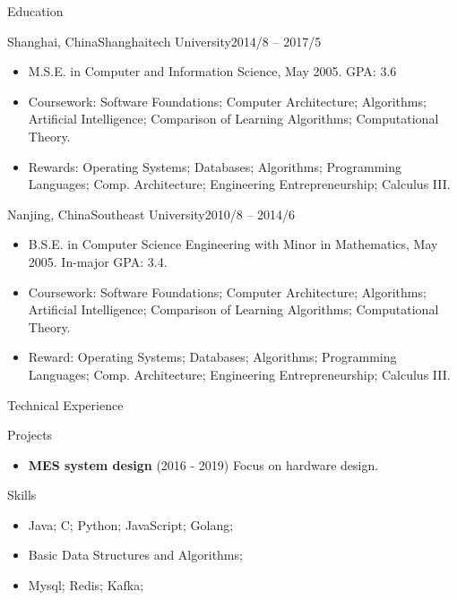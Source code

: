 \documentclass[]{minhuacv}
\begin{document}
	\begin{cvsection}{Education}
		\begin{cvsubsection}{Shanghai, China}{Shanghaitech University}{2014/8 -- 2017/5}
			\begin{itemize}
				\item M.S.E. in Computer and Information Science, May 2005. GPA: 3.6
				\item Coursework: Software Foundations; Computer Architecture; Algorithms; Artificial Intelligence; Comparison of Learning Algorithms; Computational Theory.
				\item Rewards: Operating Systems; Databases; Algorithms; Programming Languages; Comp. Architecture; Engineering Entrepreneurship; Calculus III.
			\end{itemize}
		\end{cvsubsection}
		\begin{cvsubsection}{Nanjing, China}{Southeast University}{2010/8 -- 2014/6}
			\begin{itemize}
				\item B.S.E. in Computer Science Engineering with Minor in Mathematics, May 2005.  In-major GPA: 3.4.
				\item Coursework: Software Foundations; Computer Architecture; Algorithms; Artificial Intelligence; Comparison of Learning Algorithms; Computational Theory.
				\item Reward: Operating Systems; Databases; Algorithms; Programming Languages; Comp. Architecture; Engineering Entrepreneurship; Calculus III.
			\end{itemize}
		\end{cvsubsection}
	\end{cvsection}
	
	\begin{cvsection}{Technical Experience}
		\begin{cvsubsection}{Projects}{}{}
			\begin{itemize}
				\item \textbf{MES system design} (2016 - 2019) Focus on hardware design.
			\end{itemize}
		\end{cvsubsection}
	\end{cvsection}
	
	\begin{cvsection}{Skills}
		\begin{cvsubsection}{}{}{}	
			\begin{itemize}
				\item Java; C; Python; JavaScript; Golang;
				\item Basic Data Structures and Algorithms;
				\item Mysql; Redis; Kafka;
			\end{itemize}
		\end{cvsubsection}
	\end{cvsection}
	
\end{document}
